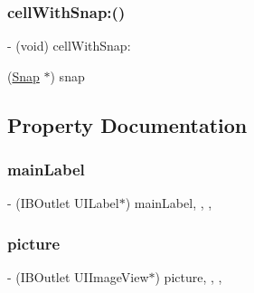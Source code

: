\subsubsection{\texorpdfstring{cell\+With\+Snap\+:()}{cellWithSnap:()}}
{\footnotesize\ttfamily -\/ (void) cell\+With\+Snap\+: \begin{DoxyParamCaption}\item[{(\hyperlink{interface_snap}{Snap} $\ast$)}]{snap }\end{DoxyParamCaption}}



\subsection{Property Documentation}
\hypertarget{interface_snap_table_view_cell_a472b0de8213a2c408bc18303972f0f7a}{}\label{interface_snap_table_view_cell_a472b0de8213a2c408bc18303972f0f7a} 
\subsubsection{\texorpdfstring{main\+Label}{mainLabel}}
{\footnotesize\ttfamily -\/ (I\+B\+Outlet U\+I\+Label$\ast$) main\+Label\hspace{0.3cm}{\ttfamily [read]}, {\ttfamily [write]}, {\ttfamily [nonatomic]}, {\ttfamily [weak]}}

\hypertarget{interface_snap_table_view_cell_ab73d6988eec1b3c683f70f5974ce749c}{}\label{interface_snap_table_view_cell_ab73d6988eec1b3c683f70f5974ce749c} 
\subsubsection{\texorpdfstring{picture}{picture}}
{\footnotesize\ttfamily -\/ (I\+B\+Outlet U\+I\+Image\+View$\ast$) picture\hspace{0.3cm}{\ttfamily [read]}, {\ttfamily [write]}, {\ttfamily [nonatomic]}, {\ttfamily [weak]}}

\hypertarget{interface_snap_table_view_cell_a01bcf70ecb074b7e89e67aeebe3de576}{}\label{interface_snap_table_view_cell_a01bcf70ecb074b7e89e67aeebe3de576} 
